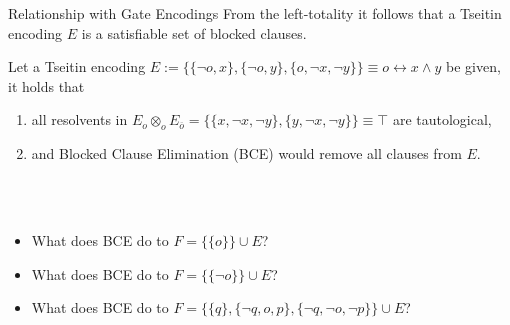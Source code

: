 \documentclass[t]{sdqbeamer}
\begin{document}
\begin{frame}{Relationship with Gate Encodings}
From the left-totality it follows that a Tseitin encoding $E$ is a satisfiable set of blocked clauses.\\[1em]
\begin{example}
Let a Tseitin encoding $E := \bigl\{\{ \lnot o, x \}, \{ \lnot o, y \}, \{ o, \lnot x, \lnot y \} \bigr\} \equiv o \leftrightarrow x \land y$ be given, it holds that\\[1em]
\begin{enumerate}\setlength{\itemsep}{1ex}
\item all resolvents in $E_o \otimes_o E_{\overline o} = \bigl\{ \{ x, \lnot x, \lnot y \}, \{ y, \lnot x, \lnot y \} \bigr\} \equiv \top$ are tautological,
\item and Blocked Clause Elimination (BCE) would remove all clauses from $E$.\\[1ex]
\end{enumerate}
\end{example}~\\[-1ex]
\\[1ex]
\begin{itemize}\setlength{\itemsep}{1ex}
\item What does BCE do to $F = \bigl\{ \{ o \} \bigr\} \cup E$?
\item What does BCE do to $F = \bigl\{ \{ \lnot o \} \bigr\} \cup E$?
\item What does BCE do to $F = \bigl\{ \{ q \}, \{ \lnot q, o, p \}, \{ \lnot q, \lnot o, \lnot p \} \bigr\} \cup E$?
\end{itemize}
\end{frame}
\end{document}
